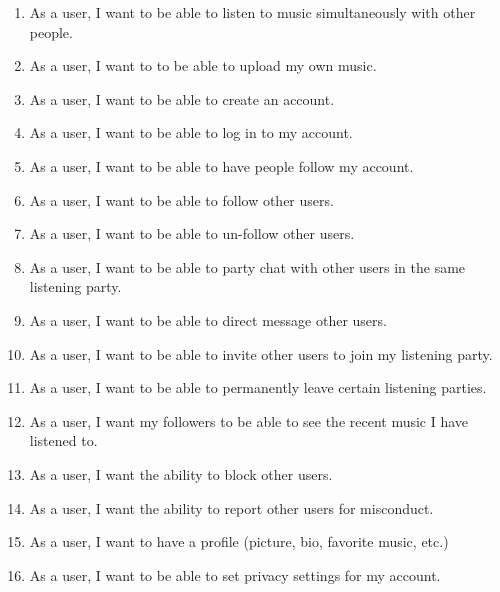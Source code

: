 \documentclass[11pt]{report}
\begin{document}
    \begin{enumerate}

    \item As a user, I want to be able to listen to music simultaneously with other people.
    
    \item As a user, I want to to be able to upload my own music.
        
    \item As a user, I want to be able to create an account.
    
    \item As a user, I want to be able to log in to my account.

    \item As a user, I want to be able to have people follow my account.

    \item As a user, I want to be able to follow other users.
    
    \item As a user, I want to be able to un-follow other users.
    
    \item As a user, I want to be able to party chat with other users in the same listening party.
    
    \item As a user, I want to be able to direct message other users.
    
    \item As a user, I want to be able to invite other users to join my listening party.
    
    \item As a user, I want to be able to permanently leave certain listening parties.
    
    \item As a user, I want my followers to be able to see the recent music I have listened to.
    
    \item As a user, I want the ability to block other users. 
    
    \item As a user, I want the ability to report other users for misconduct.
    
    \item As a user, I want to have a profile (picture, bio, favorite music, etc.)
    
    \item As a user, I want to be able to set privacy settings for my account.
    

\end{enumerate}
\end{document}
